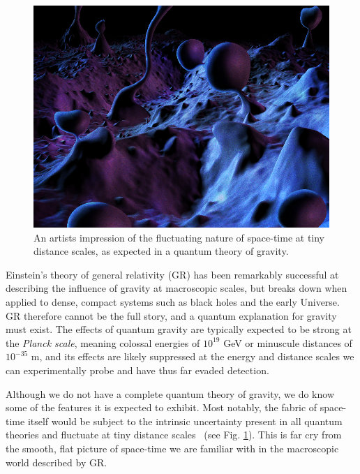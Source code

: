 \documentclass[a4paper,11pt]{article}
\begin{document}
\begin{figure} %
    \centering
		\includegraphics[width=1.\linewidth]{images/quantum_foam_2.png}
		\caption{An artists impression of the fluctuating nature of space-time at tiny distance scales, as expected in a quantum theory of gravity.}
		\vspace{-7pt}
		\label{fig:spacetime_foam}
\end{figure}

Einstein's theory of general relativity (GR) has been remarkably successful at describing the influence of gravity at macroscopic scales, but breaks down when applied to dense, compact systems such as black holes and the early Universe. GR therefore cannot be the full story, and a quantum explanation for gravity must exist. The effects of quantum gravity are typically expected to be strong at the \textit{Planck scale}, meaning colossal energies of $10^{19}$ GeV or minuscule distances of $10^{-35}$ m, and its effects are likely suppressed at the energy and distance scales we can experimentally probe and have thus far evaded detection.

Although we do not have a complete quantum theory of gravity, we do know some of the features it is expected to exhibit. Most notably, the fabric of space-time itself would be subject to the intrinsic uncertainty present in all quantum theories and fluctuate at tiny distance scales~\cite{PhysRev.97.511, Hawking} (see Fig. \ref{fig:spacetime_foam}). This is far cry from the smooth, flat picture of space-time we are familiar with in the macroscopic world described by GR. 
\end{document}
